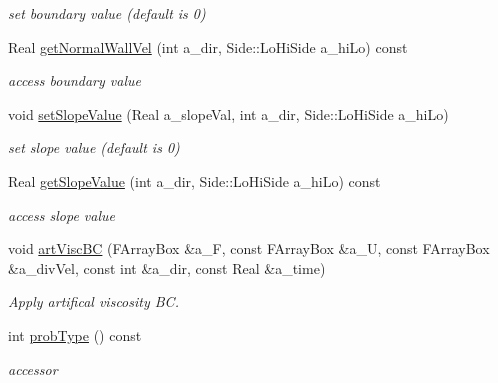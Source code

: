 \begin{DoxyCompactItemize}
\begin{DoxyCompactList}\small\item\em set boundary value (default is 0) \end{DoxyCompactList}\item 
\hypertarget{class_vel_i_b_c_a7336cd5660b2f29b9d59eacb3fa60ae5}{Real \hyperlink{class_vel_i_b_c_a7336cd5660b2f29b9d59eacb3fa60ae5}{get\-Normal\-Wall\-Vel} (int a\-\_\-dir, Side\-::\-Lo\-Hi\-Side a\-\_\-hi\-Lo) const }\label{class_vel_i_b_c_a7336cd5660b2f29b9d59eacb3fa60ae5}

\begin{DoxyCompactList}\small\item\em access boundary value \end{DoxyCompactList}\item 
\hypertarget{class_vel_i_b_c_a927055b4423e2ff7f412a36a7c7f8072}{void \hyperlink{class_vel_i_b_c_a927055b4423e2ff7f412a36a7c7f8072}{set\-Slope\-Value} (Real a\-\_\-slope\-Val, int a\-\_\-dir, Side\-::\-Lo\-Hi\-Side a\-\_\-hi\-Lo)}\label{class_vel_i_b_c_a927055b4423e2ff7f412a36a7c7f8072}

\begin{DoxyCompactList}\small\item\em set slope value (default is 0) \end{DoxyCompactList}\item 
\hypertarget{class_vel_i_b_c_af8d199f84cc3bfc4aae0c1c27a430dda}{Real \hyperlink{class_vel_i_b_c_af8d199f84cc3bfc4aae0c1c27a430dda}{get\-Slope\-Value} (int a\-\_\-dir, Side\-::\-Lo\-Hi\-Side a\-\_\-hi\-Lo) const }\label{class_vel_i_b_c_af8d199f84cc3bfc4aae0c1c27a430dda}

\begin{DoxyCompactList}\small\item\em access slope value \end{DoxyCompactList}\item 
\hypertarget{class_vel_i_b_c_a16760cd6971354c37ebe7e7482446ec4}{void \hyperlink{class_vel_i_b_c_a16760cd6971354c37ebe7e7482446ec4}{art\-Visc\-B\-C} (F\-Array\-Box \&a\-\_\-\-F, const F\-Array\-Box \&a\-\_\-\-U, const F\-Array\-Box \&a\-\_\-div\-Vel, const int \&a\-\_\-dir, const Real \&a\-\_\-time)}\label{class_vel_i_b_c_a16760cd6971354c37ebe7e7482446ec4}

\begin{DoxyCompactList}\small\item\em Apply artifical viscosity B\-C. \end{DoxyCompactList}\item 
\hypertarget{class_vel_i_b_c_a3133837da4e4555196362e6a7c73cd56}{int \hyperlink{class_vel_i_b_c_a3133837da4e4555196362e6a7c73cd56}{prob\-Type} () const }\label{class_vel_i_b_c_a3133837da4e4555196362e6a7c73cd56}

\begin{DoxyCompactList}\small\item\em accessor \end{DoxyCompactList}\end{DoxyCompactItemize}

